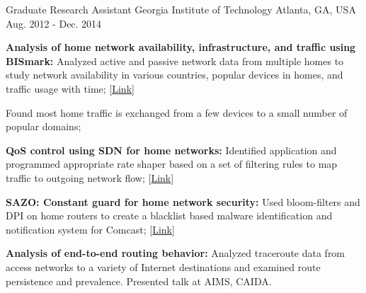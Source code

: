 \begin{cventries}
  \cventry
    {Graduate Research Assistant} %
    {Georgia Institute of Technology} %
    {Atlanta, GA, USA} %
    {Aug. 2012 - Dec. 2014} %
    {
      \begin{cvitems} %
    \item {\textbf{Analysis of home network availability, infrastructure, and traffic using BISmark:} Analyzed active and passive network data from multiple homes to study network availability in various countries, popular devices in homes, and traffic usage with time; \hfill [\href{https://www.lincs.fr/events/peeking-behind-the-nat-an-empirical-study-of-home-networks/}{Link}]}
    \item {Found most home traffic is exchanged from a few devices to a small number of popular domains;}
    \item {\textbf{QoS control using SDN for home networks:} Identified application and programmed appropriate rate shaper based on a set of filtering rules to map traffic to outgoing network flow; \hfill [\href{https://dl.acm.org/citation.cfm?doid=2620728.2620766}{Link}]}
    \item {\textbf{SAZO: Constant guard for home network security:} Used bloom-filters and DPI on home routers to create a blacklist based malware identification and notification system for Comcast; \hfill [\href{https://studyres.com/doc/8758286/panoptes--detecting-malware-activity-in-home-networks-sar}{Link}]}
    \item {\textbf{Analysis of end-to-end routing behavior:} Analyzed traceroute data from access networks to a variety of Internet destinations and examined route persistence and prevalence. Presented talk at AIMS, CAIDA.}
      \end{cvitems}
    }


\end{cventries}
